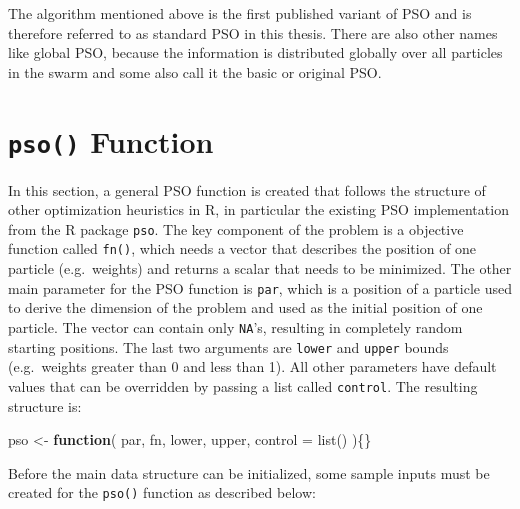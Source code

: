 \documentclass[
  oneside, a4paper, 12pt, openany]{book}
\newenvironment{Shaded}{\begin{snugshade}}{\end{snugshade}}
\newcommand{\AttributeTok}[1]{\textcolor[rgb]{0.77,0.63,0.00}{#1}}
\newcommand{\ControlFlowTok}[1]{\textcolor[rgb]{0.13,0.29,0.53}{\textbf{#1}}}
\newcommand{\FunctionTok}[1]{\textcolor[rgb]{0.00,0.00,0.00}{#1}}
\newcommand{\NormalTok}[1]{#1}
\newcommand{\OtherTok}[1]{\textcolor[rgb]{0.56,0.35,0.01}{#1}}
\theoremstyle{definition}
\theoremstyle{definition}
\theoremstyle{definition}
\theoremstyle{definition}
\theoremstyle{remark}
\begin{document}
The algorithm mentioned above is the first published variant of PSO and is therefore referred to as standard PSO in this thesis. There are also other names like global PSO, because the information is distributed globally over all particles in the swarm and some also call it the basic or original PSO.

\hypertarget{pso-function}{%
\section{\texorpdfstring{\texttt{pso()} Function}{pso() Function}}\label{pso-function}}

In this section, a general PSO function is created that follows the structure of other optimization heuristics in R, in particular the existing PSO implementation from the R package \texttt{pso}. The key component of the problem is a objective function called \texttt{fn()}, which needs a vector that describes the position of one particle (e.g.~weights) and returns a scalar that needs to be minimized. The other main parameter for the PSO function is \texttt{par}, which is a position of a particle used to derive the dimension of the problem and used as the initial position of one particle. The vector can contain only \texttt{NA}'s, resulting in completely random starting positions. The last two arguments are \texttt{lower} and \texttt{upper} bounds (e.g.~weights greater than 0 and less than 1). All other parameters have default values that can be overridden by passing a list called \texttt{control}. The resulting structure is:

\vspace{0.1cm}\fontsize{11}{12}\selectfont

\begin{Shaded}
\begin{Highlighting}[]
\NormalTok{pso }\OtherTok{\textless{}{-}} \ControlFlowTok{function}\NormalTok{(}
\NormalTok{    par, }
\NormalTok{    fn, }
\NormalTok{    lower, }
\NormalTok{    upper, }
    \AttributeTok{control =} \FunctionTok{list}\NormalTok{()}
\NormalTok{  )\{\}}
\end{Highlighting}
\end{Shaded}

\normalsize\vspace{0.1cm}

Before the main data structure can be initialized, some sample inputs must be created for the \texttt{pso()} function as described below:

\vspace{0.1cm}\fontsize{11}{12}\selectfont
\end{document}
